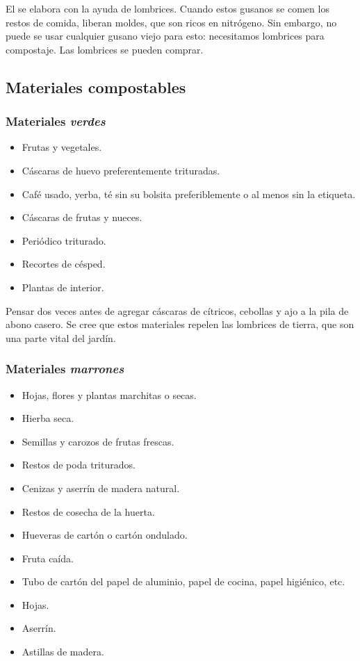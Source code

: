 \documentclass[../main.tex]{subfiles}
\begin{document}
El  se elabora con la ayuda de lombrices. Cuando estos gusanos se comen los restos de comida, liberan moldes, que son ricos en nitrógeno. Sin embargo, no puede se usar cualquier gusano viejo para esto: necesitamos lombrices para compostaje. Las lombrices se  pueden comprar.

\subsection{Materiales compostables}

\subsubsection{Materiales \emph{verdes}}

\begin{itemize}
    \item Frutas y vegetales.
    \item Cáscaras de huevo preferentemente trituradas.
    \item Café usado, yerba, té sin su bolsita preferiblemente o al menos sin la etiqueta.
    \item Cáscaras de frutas y nueces.
    \item Periódico triturado.
    \item Recortes de césped.
    \item Plantas de interior.
\end{itemize}

Pensar dos veces antes de agregar cáscaras de cítricos, cebollas y ajo a la pila de abono casero. Se cree que estos materiales repelen las lombrices de tierra, que son una parte vital del jardín.

\subsubsection{Materiales \emph{marrones}}

\begin{itemize}
    \item Hojas, flores y plantas marchitas o secas. 
    \item Hierba seca.
    \item Semillas y carozos de frutas frescas.
    \item Restos de poda triturados.
    \item Cenizas y aserrín de madera natural.
    \item Restos de cosecha de la huerta.
    \item Hueveras de cartón o cartón ondulado.
    \item Fruta caída.
    \item Tubo de cartón del papel de aluminio, papel de cocina, papel higiénico, etc.
    \item Hojas.
    \item Aserrín.
    \item Astillas de madera.
\end{itemize}
\end{document}

